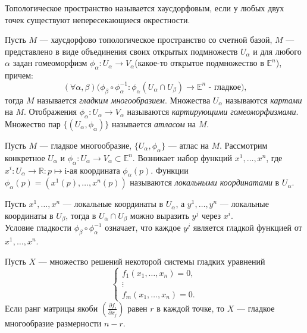 \begin{defi}
Топологическое пространство называется хаусдорфовым, если у любых двух точек существуют непересекающиеся окрестности.
\end{defi}

\begin{defi}
Пусть $M$ — хаусдорфово топологическое пространство со счетной базой, $M$ — представлено в виде объединения своих открытых подмножеств $U_{\alpha}$ и для любого $\alpha$ задан гомеоморфизм $\phi_{\alpha}:U_{\alpha}\to V_{\alpha}$(какое-то открытое подмножество в $\mathbb{E}^n$), причем: $$(\forall \alpha,\beta)(\phi_{\beta}\circ\phi_{\alpha}^{-1}:\phi_{\alpha}(U_{\alpha}\cap U_{\beta})\to\mathbb{E}^n\text{ - гладкое),}$$
тогда $M$ называется \textit{гладким многообразием}. Множества $U_{\alpha}$ называются \textit{картами} на $M$. Отображения ${\phi_{\alpha}:U_{\alpha}\to V_{\alpha}}$ называются \textit{картирующими гомеоморфизмами}. Множество пар $\{(U_\alpha,\phi_\alpha)\}$ называется \textit{атласом} на $M$.
\end{defi}

\begin{defi}
Пусть $M$ — гладкое многообразие, $\{U_\alpha,\phi_\alpha\}$ — атлас на $M$. Рассмотрим конкретное $U_\alpha$ и ${\phi_\alpha:U_\alpha\to V_\alpha\subset\mathbb{E}^n}$. Возникает набор функций ${x^1,\dots, x^n}$, где ${x^i:U_\alpha\to\mathbb{R}:p\mapsto\text{i-ая координата }\phi_\alpha(p)}$. Функции ${\phi_\alpha(p)=(x^1(p),\dots ,x^n(p))}$ называются \textit{локальными координатами} в $U_\alpha$.
\end{defi}

\begin{ass}
Пусть $x^1,\dots, x^n$ — локальные координаты в $U_\alpha$, а $y^1,\dots, y^n$ — локальные координаты в $U_\beta$, тогда в $U_\alpha\cap U_\beta$ можно выразить $y^j$ через $x^i$.\\
Условие гладкости $\phi_\beta\circ\phi_\alpha^{-1}$ означает, что каждое $y^j$ является гладкой функцией от $x^1,\dots, x^n$.
\end{ass}

\begin{thm}
Пусть $X$ — множество решений некоторой системы гладких уравнений
\begin{equation*}
 \begin{cases}
   f_1(x_1,\dots,x_n)=0,
   \\
   \vdots
   \\
   f_m(x_1,\dots,x_n)=0.
 \end{cases}
\end{equation*}
Если ранг матрицы якоби $\left(\frac{\partial f_i}{\partial x_j}\right)$ равен $r$ в каждой точке, то $X$ — гладкое многообразие размерности $n-r$.
\end{thm}


